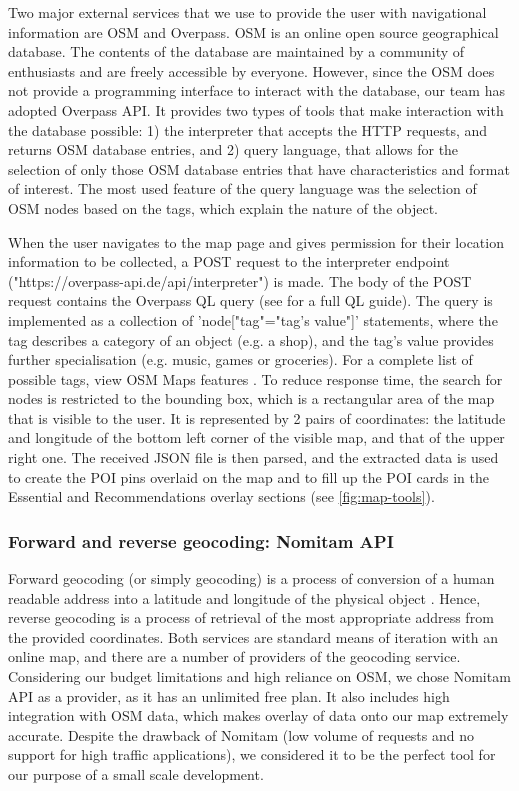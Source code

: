 Two major external services that we use to provide the user with navigational information are OSM and Overpass. OSM is an online open source geographical database. The contents of the database are maintained by a community of enthusiasts and are freely accessible by everyone. However, since the OSM does not provide a programming interface to interact with the database, our team has adopted Overpass API. It provides two types of tools that make interaction with the database possible: 1) the interpreter that accepts the HTTP requests, and returns OSM database entries, and 2) query language, that allows for the selection of only those OSM database entries that have characteristics and format of interest. The most used feature of the query language was the selection of OSM nodes based on the tags, which explain the nature of the object. 

When the user navigates to the map page and gives permission for their location information to be collected, a POST request to the interpreter endpoint ("https://overpass-api.de/api/interpreter") \cite{OverpassAPIDocsWiki} is made. The body of the POST request contains the Overpass QL query (see \cite{OverpassAPIQueryLanguageGuide} for a full QL guide). The query is implemented as a collection of 'node["tag"="tag's value"]' statements, where the tag describes a category of an object (e.g. a shop), and the tag's value provides further specialisation (e.g. music, games or groceries). For a complete list of possible tags, view OSM Maps features \cite{OSM_map_features}. To reduce response time, the search for nodes is restricted to the bounding box, which is a rectangular area of the map that is visible to the user. It is represented by 2 pairs of coordinates: the latitude and longitude of the bottom left corner of the visible map, and that of the upper right one. The received JSON file is then parsed, and the extracted data is used to create the POI pins overlaid on the map and to fill up the POI cards in the Essential and Recommendations overlay sections (see \autoref{fig:map-tools}).

\subsubsection{Forward and reverse geocoding: Nomitam API}

Forward geocoding (or simply geocoding) is a process of conversion of a human readable address into a latitude and longitude of the physical object \cite{forwardAndReverseGeocoding}. Hence, reverse geocoding is a process of retrieval of the most appropriate address from the provided coordinates. Both services are standard means of iteration with an online map, and there are a number of providers of the geocoding service. Considering our budget limitations and high reliance on OSM, we chose Nomitam API as a provider, as it has an unlimited free plan. It also includes high integration with OSM data, which makes overlay of data onto our map extremely accurate. Despite the drawback of Nomitam (low volume of requests and no support for high traffic applications), we considered it to be the perfect tool for our purpose of a small scale development. 

